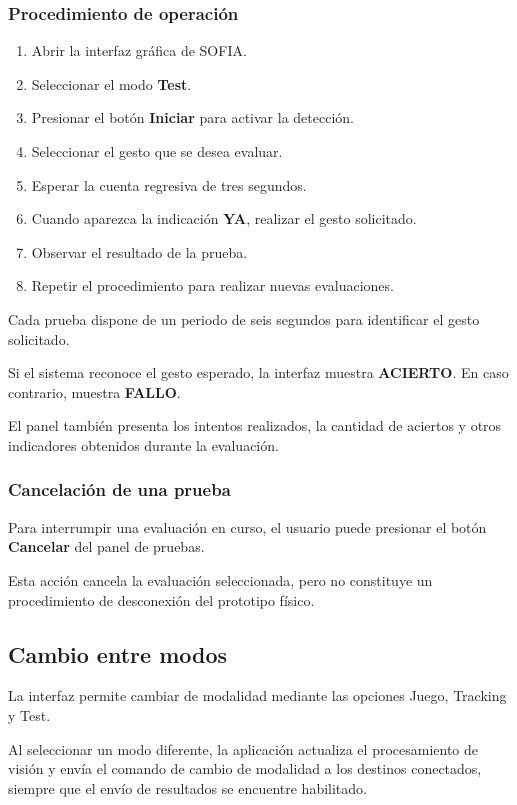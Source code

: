 \documentclass[letterpaper,journal]{IEEEtran}
\begin{document}
\subsubsection{Procedimiento de operación}

\begin{enumerate}
    \item Abrir la interfaz gráfica de SOFIA.
    \item Seleccionar el modo \textbf{Test}.
    \item Presionar el botón \textbf{Iniciar}
    para activar la detección.
    \item Seleccionar el gesto que se desea evaluar.
    \item Esperar la cuenta regresiva de
    tres segundos.
    \item Cuando aparezca la indicación
    \textbf{YA}, realizar el gesto solicitado.
    \item Observar el resultado de la prueba.
    \item Repetir el procedimiento para realizar
    nuevas evaluaciones.
\end{enumerate}

Cada prueba dispone de un periodo de seis segundos
para identificar el gesto solicitado.

Si el sistema reconoce el gesto esperado,
la interfaz muestra \textbf{ACIERTO}.
En caso contrario, muestra \textbf{FALLO}.

El panel también presenta los intentos realizados,
la cantidad de aciertos y otros indicadores
obtenidos durante la evaluación.

\subsubsection{Cancelación de una prueba}

Para interrumpir una evaluación en curso,
el usuario puede presionar el botón
\textbf{Cancelar} del panel de pruebas.

Esta acción cancela la evaluación seleccionada,
pero no constituye un procedimiento de
desconexión del prototipo físico.

\subsection{Cambio entre modos}

La interfaz permite cambiar de modalidad
mediante las opciones Juego, Tracking y Test.

Al seleccionar un modo diferente, la aplicación
actualiza el procesamiento de visión y envía
el comando de cambio de modalidad a los
destinos conectados, siempre que el envío
de resultados se encuentre habilitado.
\end{document}
